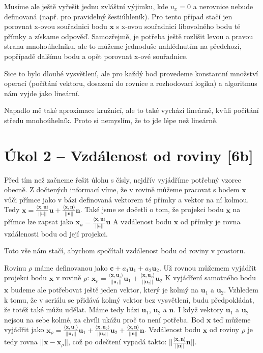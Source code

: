 \documentclass{../../../ksp}
\begin{document}
Musíme ale ještě vyřešit jednu zvláštní výjimku, kde $u_x = 0$ a nerovnice nebude definovaná (např. pro pravidelný šestiúhleník). Pro tento případ stačí jen
porovnat x-ovou souřadnici bodu $\bm{x}$ s x-ovou souřadnicí libovolného bodu té přímky a získame odpověď. Samozřejmě, je potřeba ještě rozlišit
levou a pravou stranu mnohoúhelníku, ale to můžeme jednoduše nahlédnutím na předchozí, popřípadě dalšímu bodu a opět porovnat x-ové souřadnice.

Sice to bylo dlouhé vysvětlení, ale pro každý bod provedeme konstantní množství operací (počítání vektoru, dosazení do rovnice a rozhodovací logika)
a algoritmus nám vyjde jako lineární.

Napadlo mě také aproximace kružnicí, ale to také vychází lineárně, kvůli počítání středu mnohoúhelník. Proto si nemyslím, že to jde lépe než lineárně.


\section*{Úkol 2 – Vzdálenost od roviny [6b]}


Před tím než začneme řešit úlohu s čísly, nejdřív vyjádříme potřebný vzorec obecně.
Z dočtených informací víme, že v rovině můžeme pracovat s bodem $\bm{x}$ vůči přímce jako v bázi
definovaná vektorem té přímky a vektor na ní kolmou. Tedy
$\bm{x} = \frac{\langle \bm{x}, \bm{u} \rangle}{||u||}\bm{\bm{u}} + \frac{\langle \bm{x}, \bm{n} \rangle}{||\bm{n}||}\bm{n}$.
Také jsme se dočetli o tom, že projekci bodu $\bm{x}$ na přímce lze zapsat jako
$\bm{x}_u = \frac{\langle \bm{x}, \bm{u} \rangle}{||u||}\bm{u}$
A vzdálenost bodu $\bm{x}$ od přímky je rovna vzdálenosti bodu od její projekci.

Toto vše nám stačí, abychom spočítali vzdálenost bodu od roviny v prostoru.

Rovinu $\rho$ máme definovanou jako $\bm{c} + a_1\bm{u}_1 + a_2\bm{u}_2$.
Už rovnou můžemem vyjádřit projekci bodu $\bm{x}$ v rovině $\rho$:
$\bm{x}_{\rho} = \frac{\langle \bm{x}, \bm{u}_1 \rangle}{||\bm{u}_1||}\bm{u}_1 + \frac{\langle \bm{x}, \bm{u}_2 \rangle}{||\bm{u}_2||}\bm{u}_2$
K vyjádření samotného bodu $\bm{x}$ budeme ale potřebovat ještě jeden vektor, který je kolmý na $\bm{u}_1$ a $\bm{u}_2$.
Vzhledem k tomu, že v seriálu se přidává kolmý vektor bez vysvětlení, budu předpokládat, že totéž také můžu udělat.
Máme tedy bázi $\bm{u}_1$, $\bm{u}_2$ a $\bm{n}$. I když vektory $\bm{u}_1$ a $\bm{u}_2$ nejsou na sebe kolmé, za chvíli ukážu proč to není potřeba.
Bod $\bm{x}$ teď můžeme vyjádřit jako
$\bm{x}_{\rho} = \frac{\langle \bm{x}, \bm{u}_1 \rangle}{||\bm{u}_1||}\bm{u}_1 + \frac{\langle \bm{x}, \bm{u}_2 \rangle}{||\bm{u}_2||}\bm{u}_2 + \frac{\langle \bm{x}, \bm{n} \rangle}{||\bm{n}||}\bm{n}$.
Vzdálenost bodu $\bm{x}$ od roviny $\rho$ je tedy rovna $||\bm{x} - \bm{x}_{\rho}||$, což po odečtení vypadá takto:
$||\frac{\langle \bm{x}, \bm{n} \rangle}{||\bm{n}||}\bm{n}||$.
\end{document}
